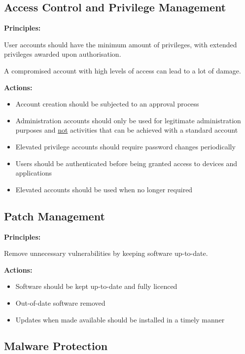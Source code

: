 \documentclass{article}
\begin{document}
\subsection{Access Control and Privilege Management}

\textbf{Principles:}

User accounts should have the minimum amount of privileges, with extended privileges awarded upon authorisation.

A compromised account with high levels of access can lead to a lot of damage.

\textbf{Actions:}

\begin{itemize}
\item 
  Account creation should be subjected to an approval process
\item 
  Administration accounts should only be used for legitimate administration purposes and \underline{not} activities that can be achieved with a standard account
\item 
  Elevated privilege accounts should require password changes periodically
\item 
  Users should be authenticated before being granted access to devices and applications
\item 
  Elevated accounts should be used when no longer required
\end{itemize}

\subsection{Patch Management}

\textbf{Principles:}

Remove unnecessary vulnerabilities by keeping software up-to-date.

\textbf{Actions:}

\begin{itemize}
\item 
  Software should be kept up-to-date and fully licenced
\item 
  Out-of-date software removed
\item 
  Updates when made available should be installed in a timely manner
\end{itemize}

\subsection{Malware Protection}
\end{document}
